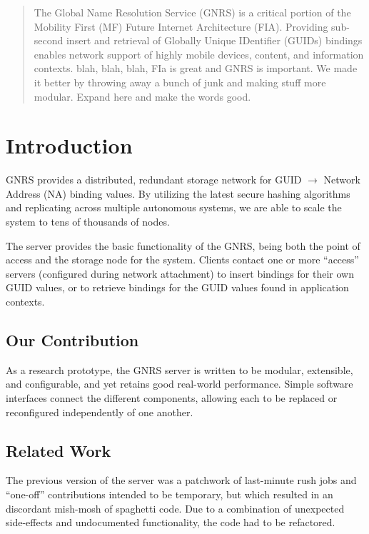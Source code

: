 \documentclass[conference, 11pt]{IEEEtran}
\begin{document}
\maketitle
\begin{abstract}
The Global Name Resolution Service (GNRS) is a critical portion of the
Mobility First (MF) Future Internet Architecture (FIA). Providing sub-second
insert and retrieval of Globally Unique IDentifier (GUIDs) bindings enables
network support of highly mobile devices, content, and information contexts.
blah, blah, blah, FIa is great and GNRS is important. We made it better by
throwing away a bunch of junk and making stuff more modular. Expand here and
make the words good.
\end{abstract}
\section{Introduction}
GNRS provides a distributed, redundant storage network for GUID $\rightarrow$
Network Address (NA) binding values.  By utilizing the latest secure hashing
algorithms and replicating across multiple autonomous systems, we are able to
scale the system to tens of thousands of nodes.  

The server provides the basic functionality of the GNRS, being both the point
of access and the storage node for the system.  Clients contact one or more
``access'' servers (configured during network attachment) to insert bindings
for their own GUID values, or to retrieve bindings for the GUID values found
in application contexts.
\subsection{Our Contribution}
As a research prototype, the GNRS server is written to be modular, extensible,
and configurable, and yet retains good real-world performance.  Simple
software interfaces connect the different components, allowing each to be
replaced or reconfigured independently of one another.
\subsection{Related Work}
The previous version of the server was a patchwork of last-minute rush jobs
and ``one-off'' contributions intended to be temporary, but which resulted in
an discordant mish-mosh of spaghetti code.  Due to a combination of unexpected
side-effects and undocumented functionality, the code had to be refactored.
\end{document}
